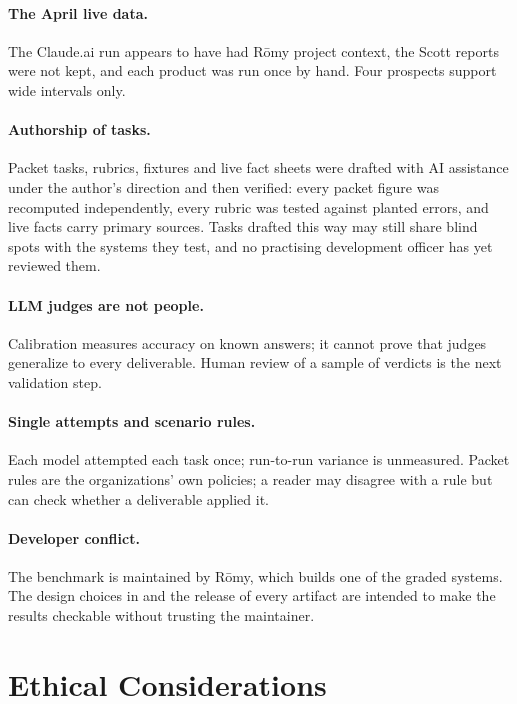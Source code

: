 \documentclass[11pt,a4paper]{article}
\newcommand{\romy}{R\={o}my}
\begin{document}
\paragraph{The April live data.} The Claude.ai run appears to have had \romy{} project context, the Scott reports were not kept, and each product was run once by hand. Four prospects support wide intervals only.

\paragraph{Authorship of tasks.} Packet tasks, rubrics, fixtures and live fact sheets were drafted with AI assistance under the author's direction and then verified: every packet figure was recomputed independently, every rubric was tested against planted errors, and live facts carry primary sources. Tasks drafted this way may still share blind spots with the systems they test, and no practising development officer has yet reviewed them.

\paragraph{LLM judges are not people.} Calibration measures accuracy on known answers; it cannot prove that judges generalize to every deliverable. Human review of a sample of verdicts is the next validation step.

\paragraph{Single attempts and scenario rules.} Each model attempted each task once; run-to-run variance is unmeasured. Packet rules are the organizations' own policies; a reader may disagree with a rule but can check whether a deliverable applied it.

\paragraph{Developer conflict.} The benchmark is maintained by \romy, which builds one of the graded systems. The design choices in  and the release of every artifact are intended to make the results checkable without trusting the maintainer.

\section{Ethical Considerations}
\label{sec:ethics}
\end{document}
